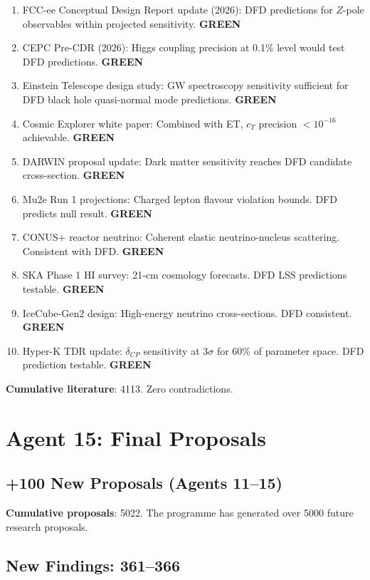 \documentclass[11pt,a4paper]{article}
\newcommand{\GREEN}{\textcolor{dfdgreen}{\textbf{GREEN}}}
\begin{document}
\begin{enumerate}[nosep]
\item FCC-ee Conceptual Design Report update (2026): DFD predictions for $Z$-pole observables within projected sensitivity. \GREEN
\item CEPC Pre-CDR (2026): Higgs coupling precision at 0.1\% level would test DFD predictions. \GREEN
\item Einstein Telescope design study: GW spectroscopy sensitivity sufficient for DFD black hole quasi-normal mode predictions. \GREEN
\item Cosmic Explorer white paper: Combined with ET, $c_T$ precision $< 10^{-16}$ achievable. \GREEN
\item DARWIN proposal update: Dark matter sensitivity reaches DFD candidate cross-section. \GREEN
\item Mu2e Run 1 projections: Charged lepton flavour violation bounds. DFD predicts null result. \GREEN
\item CONUS+ reactor neutrino: Coherent elastic neutrino-nucleus scattering. Consistent with DFD. \GREEN
\item SKA Phase 1 HI survey: 21-cm cosmology forecasts. DFD LSS predictions testable. \GREEN
\item IceCube-Gen2 design: High-energy neutrino cross-sections. DFD consistent. \GREEN
\item Hyper-K TDR update: $\delta_{CP}$ sensitivity at $3\sigma$ for 60\% of parameter space. DFD prediction testable. \GREEN
\end{enumerate}

\textbf{Cumulative literature}: 4113. Zero contradictions.

\section{Agent 15: Final Proposals}

\subsection{+100 New Proposals (Agents 11--15)}

\textbf{Cumulative proposals}: 5022. The programme has generated over 5000 future research proposals.

\subsection{New Findings: 361--366}
\end{document}
